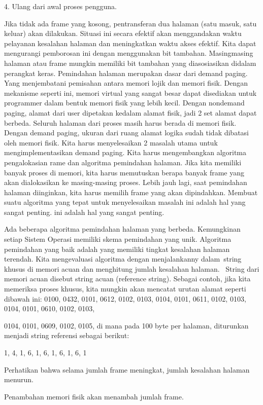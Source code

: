 4. Ulang dari awal proses pengguna.

Jika tidak ada frame yang kosong, pentransferan dua halaman (satu masuk, satu keluar) akan dilakukan. Situasi ini secara efektif akan menggandakan waktu pelayanan kesalahan halaman dan meningkatkan waktu akses efektif. Kita dapat mengurangi pemborosan ini dengan menggunakan bit tambahan. Masingmasing halaman atau frame mungkin memiliki bit tambahan yang diasosiasikan didalam perangkat keras. Pemindahan halaman merupakan dasar dari demand paging. Yang menjembatani pemisahan antara memori lojik dan memori fisik. Dengan mekanisme seperti ini, memori virtual yang sangat besar dapat disediakan untuk programmer dalam bentuk memori fisik yang lebih kecil. Dengan nondemand paging, alamat dari user dipetakan kedalam alamat fisik, jadi 2 set alamat dapat berbeda. Seluruh halaman dari proses masih harus berada di memori fisik. Dengan demand paging, ukuran dari ruang alamat logika sudah tidak dibatasi oleh memori fisik.
Kita harus menyelesaikan 2 masalah utama untuk mengimplementasikan demand paging. Kita harus  mengembangkan algoritma pengalokasian rame dan algoritma pemindahan halaman. Jika kita memiliki banyak proses di memori, kita harus memutuskan berapa banyak frame yang akan dialokasikan ke masing-masing proses. Lebih jauh lagi, saat pemindahan halaman diinginkan, kita harus memilih frame yang akan dipindahkan. Membuat suatu algoritma yang tepat untuk menyelesaikan masalah ini adalah hal yang sangat penting.
ini adalah hal yang sangat penting.

Ada beberapa algoritma pemindahan halaman yang berbeda. Kemungkinan setiap Sistem Operasi memiliki skema pemindahan yang unik. Algoritma pemindahan yang baik adalah yang memiliki tingkat kesalahan halaman terendah. Kita mengevaluasi algoritma dengan menjalankanny dalam string khusus di memori acuan dan menghitung jumlah kesalahan halaman.  String dari memori acuan disebut string acuan (reference string). Sebagai contoh, jika kita memeriksa proses khusus, kita mungkin akan mencatat urutan alamat seperti dibawah ini:
0100, 0432, 0101, 0612, 0102, 0103, 0104, 0101, 0611, 0102, 0103, 0104, 0101, 0610, 0102, 0103,

0104, 0101, 0609, 0102, 0105, di mana pada 100 byte per halaman, diturunkan menjadi string referensi sebagai berikut:

1, 4, 1, 6, 1, 6, 1, 6, 1, 6, 1 

Perhatikan bahwa selama jumlah frame meningkat, jumlah kesalahan halaman menurun.

Penambahan memori fisik akan menambah jumlah frame.

